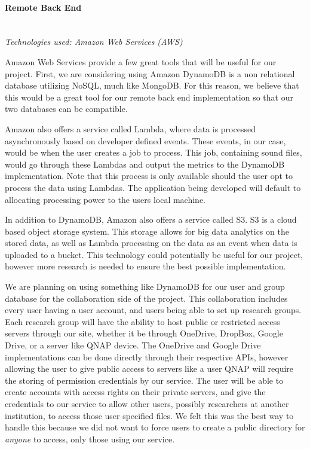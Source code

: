 \paragraph{Remote Back End} \mbox{} \\
\textit{Technologies used: Amazon Web Services (AWS)}\par
Amazon Web Services provide a few great tools that will be useful for our project. First, we are considering using Amazon DynamoDB is a non relational database utilizing NoSQL, much like MongoDB. For this reason, we believe that this would be a great tool for our remote back end implementation so that our two databases can be compatible.\par
Amazon also offers a service called Lambda, where data is processed asynchronously based on developer defined events. These events, in our case, would be when the user creates a job to process. This job, containing sound files, would go through these Lambdas and output the metrics to the DynamoDB implementation. Note that this process is only available should the user opt to process the data using Lambdas. The application being developed will default to allocating processing power to the user\textquotesingle s local machine.\par
In addition to DynamoDB, Amazon also offers a service called S3. S3 is a cloud based object storage system. This storage allows for big data analytics on the stored data, as well as Lambda processing on the data as an event when data is uploaded to a bucket. This technology could potentially be useful for our project, however more research is needed to ensure the best possible implementation.\par
We are planning on using something like DynamoDB for our user and group database for the collaboration side of the project. This collaboration includes every user having a user account, and users being able to set up research groups. Each research group will have the ability to host public or restricted access servers through our site, whether it be through OneDrive, DropBox, Google Drive, or a server like QNAP device. The OneDrive and Google Drive implementations can be done directly through their respective APIs, however allowing the user to give public access to servers like a user QNAP will require the storing of permission credentials by our service. The user will be able to create accounts with access rights on their private servers, and give the credentials to our service to allow other users, possibly researchers at another institution, to access those user specified files. We felt this was the best way to handle this because we did not want to force users to create a public directory for \textit{anyone} to access, only those using our service.\par
\newpage
